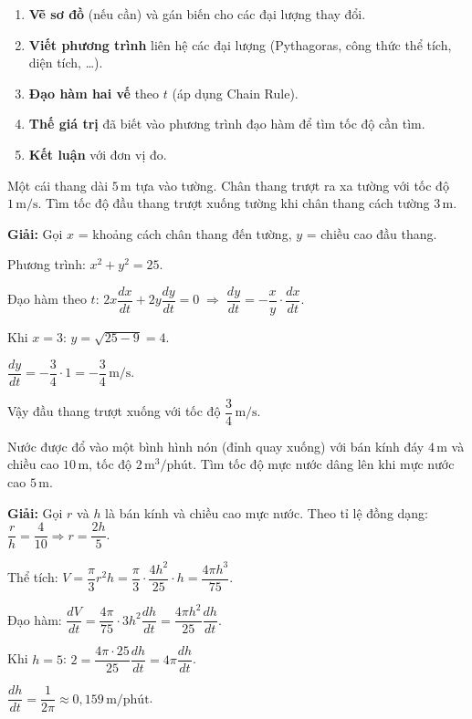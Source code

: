 \documentclass[12pt,a4paper]{article}
\begin{document}
\begin{phuongphap}[title={Các bước giải bài toán Related Rates}]
  \begin{enumerate}
    \item \textbf{Vẽ sơ đồ} (nếu cần) và gán biến cho các đại lượng thay đổi.
    \item \textbf{Viết phương trình} liên hệ các đại lượng (Pythagoras, công thức thể tích, diện tích, \ldots).
    \item \textbf{Đạo hàm hai vế} theo $t$ (áp dụng Chain Rule).
    \item \textbf{Thế giá trị} đã biết vào phương trình đạo hàm để tìm tốc độ cần tìm.
    \item \textbf{Kết luận} với đơn vị đo.
  \end{enumerate}
\end{phuongphap}

\begin{vidu}
  Một cái thang dài $5\,\text{m}$ tựa vào tường. Chân thang trượt ra xa tường với tốc độ $1\,\text{m/s}$. Tìm tốc độ đầu thang trượt xuống tường khi chân thang cách tường $3\,\text{m}$.

  \medskip\textbf{Giải:}
  Gọi $x$ = khoảng cách chân thang đến tường, $y$ = chiều cao đầu thang.

  Phương trình: $x^2 + y^2 = 25$.

  Đạo hàm theo $t$: $2x\dfrac{dx}{dt} + 2y\dfrac{dy}{dt} = 0 \;\Rightarrow\; \dfrac{dy}{dt} = -\dfrac{x}{y}\cdot\dfrac{dx}{dt}$.

  Khi $x = 3$: $y = \sqrt{25 - 9} = 4$.

  $\dfrac{dy}{dt} = -\dfrac{3}{4} \cdot 1 = -\dfrac{3}{4}\,\text{m/s}$.

  Vậy đầu thang trượt xuống với tốc độ $\dfrac{3}{4}\,\text{m/s}$.
\end{vidu}

\begin{vidu}
  Nước được đổ vào một bình hình nón (đỉnh quay xuống) với bán kính đáy $4\,\text{m}$ và chiều cao $10\,\text{m}$, tốc độ $2\,\text{m}^3/\text{phút}$. Tìm tốc độ mực nước dâng lên khi mực nước cao $5\,\text{m}$.

  \medskip\textbf{Giải:}
  Gọi $r$ và $h$ là bán kính và chiều cao mực nước. Theo tỉ lệ đồng dạng: $\dfrac{r}{h} = \dfrac{4}{10} \Rightarrow r = \dfrac{2h}{5}$.

  Thể tích: $V = \dfrac{\pi}{3} r^2 h = \dfrac{\pi}{3} \cdot \dfrac{4h^2}{25} \cdot h = \dfrac{4\pi h^3}{75}$.

  Đạo hàm: $\dfrac{dV}{dt} = \dfrac{4\pi}{75} \cdot 3h^2 \dfrac{dh}{dt} = \dfrac{4\pi h^2}{25} \dfrac{dh}{dt}$.

  Khi $h = 5$: $2 = \dfrac{4\pi \cdot 25}{25} \dfrac{dh}{dt} = 4\pi \dfrac{dh}{dt}$.

  $\dfrac{dh}{dt} = \dfrac{1}{2\pi} \approx 0{,}159\,\text{m/phút}$.
\end{vidu}
\end{document}
